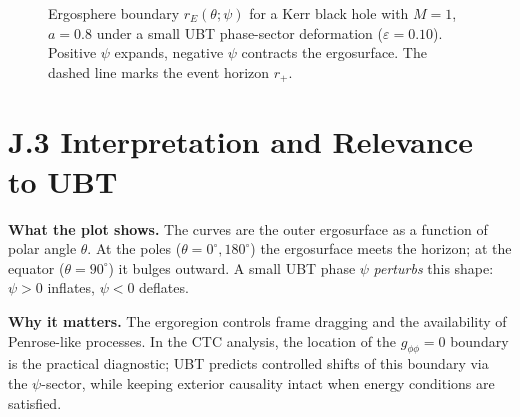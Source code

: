 \documentclass[12pt]{article}
\begin{document}
\begin{figure}[h!]
\centering
{}
\caption{Ergosphere boundary $r_E(\theta;\psi)$ for a Kerr black hole with $M=1$, $a=0.8$ under a small UBT phase-sector deformation ($\varepsilon=0.10$). Positive $\psi$ expands, negative $\psi$ contracts the ergosurface. The dashed line marks the event horizon $r_+$.}
\label{fig:pgf_ergo}
\end{figure}

\section*{J.3 Interpretation and Relevance to UBT}
\textbf{What the plot shows.} The curves are the outer ergosurface as a function of polar angle $\theta$. 
At the poles ($\theta=0^\circ,180^\circ$) the ergosurface meets the horizon; at the equator ($\theta=90^\circ$) it bulges outward. 
A small UBT phase $\psi$ \emph{perturbs} this shape: $\psi>0$ inflates, $\psi<0$ deflates.

\textbf{Why it matters.} The ergoregion controls frame dragging and the availability of Penrose-like processes. 
In the CTC analysis, the location of the $g_{\phi\phi}=0$ boundary is the practical diagnostic; 
UBT predicts controlled shifts of this boundary via the $\psi$-sector, while keeping exterior causality intact when energy conditions are satisfied.
\end{document}
